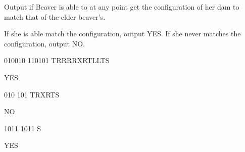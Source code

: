 \begin{formalout}
Output if Beaver is able to at any point get the configuration of her dam to match that of the elder beaver's.

If she is able match the configuration, output YES. 
If she never matches the configuration, output NO.
\end{formalout}

\begin{datain}
010010
110101
TRRRRXRTLLTS
\end{datain}
\begin{dataout}
YES
\end{dataout}

\begin{datain}
010
101
TRXRTS
\end{datain}
\begin{dataout}
NO
\end{dataout}

\begin{datain}
1011
1011
S
\end{datain}
\begin{dataout}
YES
\end{dataout}
